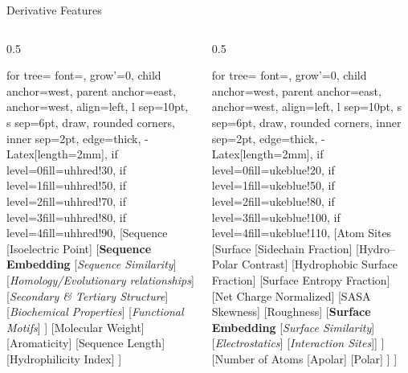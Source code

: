 \begin{frame}{Derivative Features}
	\begin{columns}[T, totalwidth=\linewidth]
		\hspace*{-1cm}
		\begin{column}{0.5\linewidth}
			\begin{forest}
				for tree={
					font=\scriptsize,
					grow'=0,
					child anchor=west,
					parent anchor=east,
					anchor=west,
					align=left,
					l sep=10pt,
					s sep=6pt,
					draw,
					rounded corners,
					inner sep=2pt,
					edge={thick, -{Latex[length=2mm]}},
					if level=0{fill=uhhred!30}{},
					if level=1{fill=uhhred!50}{},
					if level=2{fill=uhhred!70}{},
					if level=3{fill=uhhred!80}{},
					if level=4{fill=uhhred!90}{},
				}
				[Sequence
				[Isoelectric Point]
				[\textbf{Sequence Embedding}
				[\textit{Sequence Similarity}]
				[\textit{Homology/Evolutionary relationships}]
				[\textit{Secondary \& Tertiary Structure}]
				[\textit{Biochemical Properties}]
				[\textit{Functional Motifs}]
				]
				[Molecular Weight]
				[Aromaticity]
				[Sequence Length]
				[Hydrophilicity Index]
				]
			\end{forest}
		\end{column}

		\begin{column}{0.5\linewidth}
			\hspace*{-1.1cm}
			\begin{forest}
				for tree={
					font=\scriptsize,
					grow'=0,
					child anchor=west,
					parent anchor=east,
					anchor=west,
					align=left,
					l sep=10pt,
					s sep=6pt,
					draw,
					rounded corners,
					inner sep=2pt,
					edge={thick, -{Latex[length=2mm]}},
					if level=0{fill=ukeblue!20}{},
					if level=1{fill=ukeblue!50}{},
					if level=2{fill=ukeblue!80}{},
					if level=3{fill=ukeblue!100}{},
					if level=4{fill=ukeblue!110}{},
				}
				[Atom Sites
				[Surface
				[Sidechain Fraction]
				[Hydro–Polar Contrast]
				[Hydrophobic Surface Fraction]
				[Surface Entropy Fraction]
				[Net Charge Normalized]
				[SASA Skewness]
				[Roughness]
				[\textbf{Surface Embedding} [\textit{Surface Similarity}] [\textit{Electrostatics}] [\textit{Interaction Sites}]]
				]
				[Number of Atoms
				[Apolar]
				[Polar]
				]
				]
			\end{forest}
		\end{column}
		
	\end{columns}
\end{frame}


